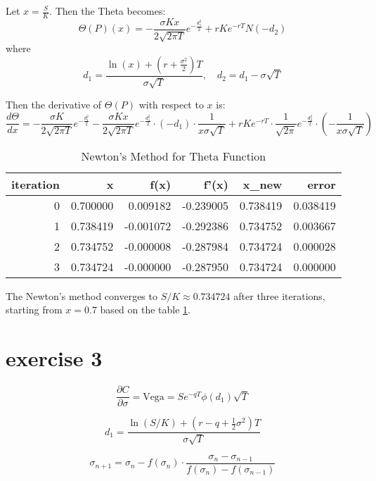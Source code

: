 \documentclass{article}
\begin{document}
Let \( x = \frac{S}{K} \). Then the Theta becomes:
\[
    \Theta(P)(x) = -\frac{\sigma K x}{2\sqrt{2\pi T}} e^{-\frac{d_1^2}{2}} + rK e^{-rT} N(-d_2)
\]
where
\[
    d_1 = \frac{\ln(x) + \left(r + \frac{\sigma^2}{2} \right)T}{\sigma\sqrt{T}}, \quad d_2 = d_1 - \sigma\sqrt{T}
\]

Then the derivative of \( \Theta(P) \) with respect to \( x \) is:
\[
    \frac{d\Theta}{dx} = -\frac{\sigma K}{2\sqrt{2\pi T}} e^{-\frac{d_1^2}{2}}
    - \frac{\sigma K x}{2\sqrt{2\pi T}} e^{-\frac{d_1^2}{2}} \cdot (-d_1) \cdot \frac{1}{x \sigma \sqrt{T}}
    + rK e^{-rT} \cdot \frac{1}{\sqrt{2\pi}} e^{-\frac{d_2^2}{2}} \cdot \left(-\frac{1}{x \sigma \sqrt{T}} \right)
\]

\begin{table}
    \centering
    \caption{Newton's Method for Theta Function}
    \label{tab:newton_theta}
    \begin{tabular}{rrrrrr}
        \toprule
        iteration & x        & f(x)      & f'(x)     & x\_new   & error    \\
        \midrule
        0         & 0.700000 & 0.009182  & -0.239005 & 0.738419 & 0.038419 \\
        1         & 0.738419 & -0.001072 & -0.292386 & 0.734752 & 0.003667 \\
        2         & 0.734752 & -0.000008 & -0.287984 & 0.734724 & 0.000028 \\
        3         & 0.734724 & -0.000000 & -0.287950 & 0.734724 & 0.000000 \\
        \bottomrule
    \end{tabular}
\end{table}

The Newton's method converges to \( S/K \approx 0.734724 \) after three iterations,
starting from \( x = 0.7 \) based on the table \ref{tab:newton_theta}.

\section{exercise 3}
\[
    \frac{\partial C}{\partial \sigma} = \text{Vega} = S e^{-qT} \phi(d_1) \sqrt{T}
\]

\[
    d_1 = \frac{\ln(S/K) + (r - q + \frac{1}{2} \sigma^2)T}{\sigma \sqrt{T}}
\]

\[
    \sigma_{n+1} = \sigma_n - f(\sigma_n) \cdot \frac{\sigma_n - \sigma_{n-1}}{f(\sigma_n) - f(\sigma_{n-1})}
\]
\end{document}
